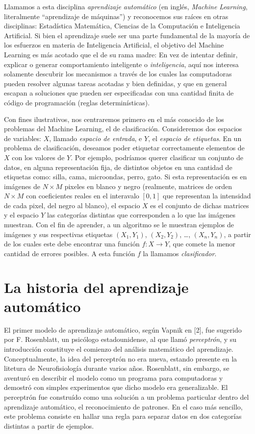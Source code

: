 \documentclass{report}
\begin{document}
Llamamos a esta disciplina \textit{aprendizaje automático} (en inglés, \textit{Machine Learning}, literalmente ``aprendizaje de máquinas'') y reconocemos
sus raíces en otras disciplinas: Estadística Matemática, Ciencias de la Computación e Inteligencia Artificial. Si bien el aprendizaje suele ser una
parte fundamental de la mayoría de los esfuerzos en materia de Inteligencia Artificial, el objetivo del Machine Learning es más acotado que el de su 
rama madre: En vez de intentar definir, explicar o generar comportamiento inteligente o \textit{inteligencia}, aquí nos interesa solamente descubrir los mecanismos
a través de los cuales las computadoras pueden resolver algunas tareas acotadas y bien definidas, y que en general escapan a soluciones que pueden
ser especificadas con una cantidad finita de código de programación (reglas determinísticas).

Con fines ilustrativos, nos centraremos primero en el más conocido de los problemas del Machine Learning, el de clasificación. Consideremos dos espacios
de variables: \(X\), llamado \textit{espacio de entrada}, e \(Y\), el  \textit{espacio de etiquetas}. En un problema de clasificación, deseamos poder etiquetar
correctamente elementos de \(X\) con los valores de \(Y\). Por ejemplo, podríamos querer clasificar un conjunto de datos, en alguna representación fija, de distintos 
objetos en una cantidad de etiquetas como: silla, cama, microondas, perro, gato. Si esta representación es en imágenes de \(N\times M\) pixeles en blanco y negro (realmente, 
matrices de orden \(N\times M\) con coeficientes reales en el interavalo \([0,1]\) que representan la intensidad de cada pixel, del negro al blanco), el espacio \(X\) es 
el conjunto de dichas matrices y el espacio \(Y\) las categorías distintas que corresponden a lo que las imágenes muestran. Con el fin de aprender, a un algoritmo se le 
muestran ejemplos de imágenes y sus respectivas etiquetas \((X_1,Y_1)\), \((X_2,Y_2)\), \dots, \((X_n,Y_n)\), a partir de los cuales este debe encontrar una función
\(f: X\rightarrow Y\), que comete la menor cantidad de errores posibles. A esta función \(f\) la llamamos \textit{clasificador}.

\section{La historia del aprendizaje automático}

El primer modelo de aprendizaje automático, según Vapnik en [2], fue sugerido por F. Rosenblatt, un psicólogo estadounidense, al que llamó \textit{perceptrón}, y su introducción
constituye el comienzo del análisis matemático del aprendizaje. Conceptualmente, la idea del perceptrón no era nueva, estando presente en la litetura de Neurofisiología durante
varios años. Rosenblatt, sin embargo, se aventuró en describir el modelo como un programa para computadoras y demostró con simples experimentos que dicho modelo era generalizable.
El perceptrón fue construído como una solución a un problema particular dentro del aprendizaje automático, el reconocimiento de patrones. En el caso más sencillo, este problema
consiste en hallar una regla para separar datos en dos categorías distintas a partir de ejemplos.
\end{document}

